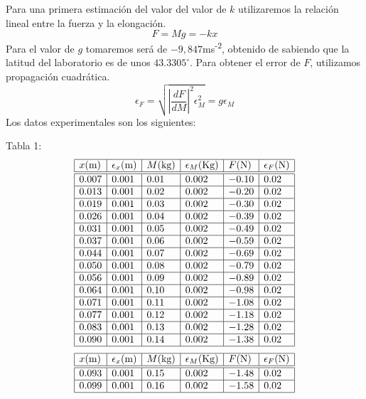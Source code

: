 \documentclass{article}
\begin{document}
\begin{multicols}{2}
Para una primera estimación del valor del valor de $k$ utilizaremos la relación lineal entre la fuerza y la elongación.
$$
 F = Mg = -kx
$$
Para el valor de $g$ tomaremos será de $-9,847$ms\textsuperscript{-2}, obtenido de \cite{gravedad} sabiendo que la latitud del laboratorio es de unos $43.3305^\circ$. Para obtener el error de $F$, utilizamos propagación cuadrática.
$$
\epsilon_F = \sqrt{\left| \frac{dF}{dM} \right|^2 \epsilon_M^2 } = g \epsilon_M
$$
Los datos experimentales son los siguientes:
\begin{center}
Tabla 1:
$$
\begin{array}{|l|l|l|l|l|l|} \hline
  x\text{(m)} & \epsilon_x\text{(m)} & M\text{(kg)} & \epsilon_M\text{(Kg)} & F\text{(N)} & \epsilon_F\text{(N)} \\ \hline \hline
  0.007 & 0.001 & 0.01 & 0.002 & -0.10 & 0.02  \\ \hline
  0.013 & 0.001 & 0.02 & 0.002 & -0.20 & 0.02  \\ \hline
  0.019 & 0.001 & 0.03 & 0.002 & -0.30 & 0.02  \\ \hline
  0.026 & 0.001 & 0.04 & 0.002 & -0.39 & 0.02  \\ \hline
  0.031 & 0.001 & 0.05 & 0.002 & -0.49 & 0.02  \\ \hline
  0.037 & 0.001 & 0.06 & 0.002 & -0.59 & 0.02  \\ \hline
  0.044 & 0.001 & 0.07 & 0.002 & -0.69 & 0.02  \\ \hline
  0.050 & 0.001 & 0.08 & 0.002 & -0.79 & 0.02  \\ \hline
  0.056 & 0.001 & 0.09 & 0.002 & -0.89 & 0.02  \\ \hline
  0.064 & 0.001 & 0.10 & 0.002 & -0.98 & 0.02  \\ \hline
  0.071 & 0.001 & 0.11 & 0.002 & -1.08 & 0.02  \\ \hline
  0.077 & 0.001 & 0.12 & 0.002 & -1.18 & 0.02  \\ \hline
  0.083 & 0.001 & 0.13 & 0.002 & -1.28 & 0.02  \\ \hline
  0.090 & 0.001 & 0.14 & 0.002 & -1.38 & 0.02  \\ \hline
\end{array}
$$
$$
  \begin{array}{|l|l|l|l|l|l|} \hline
  x\text{(m)} & \epsilon_x\text{(m)} & M\text{(kg)} & \epsilon_M\text{(Kg)} & F\text{(N)} & \epsilon_F\text{(N)} \\ \hline \hline
  0.093 & 0.001 & 0.15 & 0.002 & -1.48 & 0.02  \\ \hline
  0.099 & 0.001 & 0.16 & 0.002 & -1.58 & 0.02  \\ \hline

\end{array}$$
\end{center}
\end{multicols}
\end{document}
